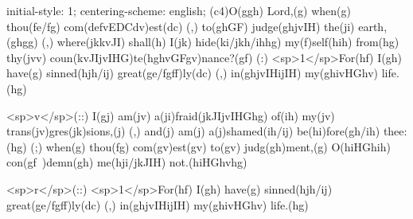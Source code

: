 initial-style: 1;
centering-scheme: english;
(c4)O(ggh) Lord,(g) when(g) thou(fe/fg) com(defvEDCdv)est(dc) (,) to(ghGF) judge(ghjvIH) the(ji) earth,(ghgg) (,) where(jkkvJI) shall(h) I(jk) hide(ki/jkh/ihhg) my(f)self(hih) from(hg) thy(jvv) coun(kvJIjvIHG)te(hghvGFgv)nance?(gf) (:) <sp>1</sp>For(hf) I(gh) have(g) sinned(hjh/ij) great(ge/fgff)ly(dc) (,) in(ghjvIHijIH) my(ghivHGhv) life.(hg)

<sp>v</sp>(::) I(gj) am(jv) a(ji)fraid(jkJIjvIHGhg) of(ih) my(jv) trans(jv)gres(jk)sions,(j) (,) and(j) am(j) a(j)shamed(ih/ij) be(hi)fore(gh/ih) thee:(hg) (;) when(g) thou(fg) com(gv)est(gv) to(gv) judg(gh)ment,(g) O(hiHGhih) con(gf~)demn(gh) me(hji/jkJIH) not.(hiHGhvhg)

<sp>r</sp>(::) <sp>1</sp>For(hf) I(gh) have(g) sinned(hjh/ij) great(ge/fgff)ly(dc) (,) in(ghjvIHijIH) my(ghivHGhv) life.(hg)